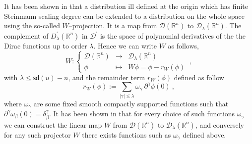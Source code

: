 \documentclass[11pt]{book}
\newcommand{\sd}{\mathsf{sd}}
\newcommand{\abs}[1]{\left|#1\right|}
\newcommand{\Dcal}{\mathcal{D}}
\newcommand{\Rbb}{\mathbb{R}}
\theoremstyle{break}
\begin{document}
It has been shown in \cite{BF_2000} that a distribution ill defined at the origin which has finite Steinmann scaling degree can be extended to a distribution on the whole space using the so-called $W$--projection. It is a map from $\Dcal(\Rbb^n)$ to $\Dcal_\lambda(\Rbb^n)$. The complement of $D^\prime_\lambda(\Rbb^n)$ in $\Dcal^\prime$ is the space of polynomial derivatives of the the Dirac functions up to order $\lambda$. Hence we can write $W$ as follows,
%
\begin{equation}
W : \left\{
\begin{array}{ccl}
\Dcal(\Rbb^n) & \to & \Dcal_\lambda(\Rbb^n) \\
\phi & \mapsto & W \phi = \phi - r_W(\phi)
\end{array}
\right. \ , \label{eq:w_projection}
\end{equation}
%
with $\lambda \leq \sd(u)-n$, and the remainder term $r_W(\phi)$ defined as follow
%
\begin{equation*}
r_W(\phi) := \underset{\abs{\gamma}\leq\lambda}{\sum} \omega_\gamma \ \partial^\gamma \phi(0) \ ,
\end{equation*}
%
where $\omega_\gamma$ are some fixed smooth compactly supported functions such that $\partial^\gamma\omega_\beta(0) = \delta^\gamma_\beta$. It has been shown in \cite[lemma 11]{DF_2004} that for every choice of such functions $\omega_\gamma$ we can construct the linear map $W$ from $\Dcal(\Rbb^n)$ to $\Dcal_\lambda(\Rbb^n)$, and conversely for any such projector $W$ there exists functions such as $\omega_\gamma$ defined above.
\end{document}
